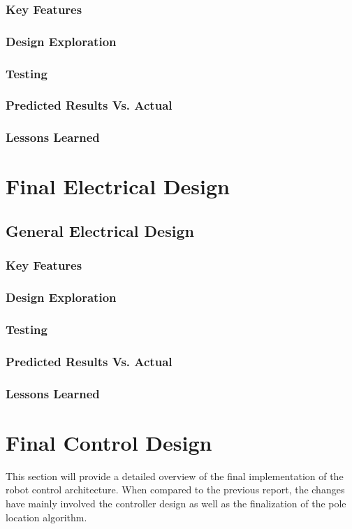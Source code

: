 \documentclass[ece]{uw-wkrpt}
\let\oldsection\section
\renewcommand\section{\clearpage\oldsection}
\begin{document}
\subsubsection{Key Features}
\subsubsection{Design Exploration}
\subsubsection{Testing}
\subsubsection{Predicted Results Vs. Actual}
\subsubsection{Lessons Learned}
% 
\section{Final Electrical Design}
\subsection{General Electrical Design}
\subsubsection{Key Features}
\subsubsection{Design Exploration} 
\subsubsection{Testing} 
\subsubsection{Predicted Results Vs. Actual} 
\subsubsection{Lessons Learned}
% 
\section{Final Control Design}
This section will provide a detailed overview of the final implementation of the robot control architecture. When compared to the previous report, the changes have mainly involved the controller design as well as the finalization of the pole location algorithm.
% 
\end{document}
